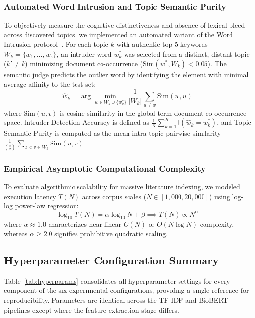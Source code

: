 \documentclass[a4paper,fleqn]{cas-dc}
\begin{document}
\subsubsection{Automated Word Intrusion and Topic Semantic Purity}

To objectively measure the cognitive distinctiveness and absence of lexical bleed across discovered topics, we implemented an automated variant of the Word Intrusion protocol~\cite{ref29}. For each topic $k$ with authentic top-5 keywords $W_k = \{w_1, \dots, w_5\}$, an intruder word $w_k^*$ was selected from a distinct, distant topic ($k' \ne k$) minimizing document co-occurrence ($\text{Sim}(w^*, W_k) < 0.05$). The semantic judge predicts the outlier word by identifying the element with minimal average affinity to the test set:
\begin{equation}
\hat{w}_k = \arg\min_{w \in W_k \cup \{w_k^*\}} \frac{1}{|W_k|} \sum_{u \ne w} \text{Sim}(w, u)
\end{equation}
where $\text{Sim}(u, v)$ is cosine similarity in the global term-document co-occurrence space. Intruder Detection Accuracy is defined as $\frac{1}{K} \sum_{k=1}^K \mathbb{I}(\hat{w}_k = w_k^*)$, and Topic Semantic Purity is computed as the mean intra-topic pairwise similarity $\frac{1}{\binom{5}{2}} \sum_{u < v \in W_k} \text{Sim}(u, v)$.

\subsubsection{Empirical Asymptotic Computational Complexity}

To evaluate algorithmic scalability for massive literature indexing, we modeled execution latency $T(N)$ across corpus scales ($N \in [1{,}000, 20{,}000]$) using log-log power-law regression:
\begin{equation}
\log_{10} T(N) = \alpha \log_{10} N + \beta \implies T(N) \propto N^\alpha
\end{equation}
where $\alpha \approx 1.0$ characterizes near-linear $O(N)$ or $O(N \log N)$ complexity, whereas $\alpha \ge 2.0$ signifies prohibitive quadratic scaling.

\subsection{Hyperparameter Configuration Summary}

Table~\ref{tab:hyperparams} consolidates all hyperparameter settings for every component of the six experimental configurations, providing a single reference for reproducibility. Parameters are identical across the TF-IDF and BioBERT pipelines except where the feature extraction stage differs.
\end{document}
